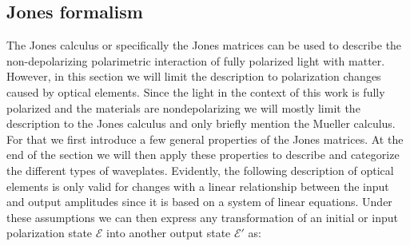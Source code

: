 \subsection{Jones formalism}
\label{sec:jonescalc}
The Jones calculus or specifically the Jones matrices can be used to describe the non-depolarizing polarimetric interaction of fully polarized light with matter. However, in this section we will limit the description to polarization changes caused by optical elements. Since the light in the context of this work is fully polarized and the materials are nondepolarizing we will mostly limit the description to the Jones calculus and only briefly mention the Mueller calculus. For that we first introduce a few general properties of the Jones matrices. At the end of the section we will then apply these properties to describe and categorize the different types of waveplates. Evidently, the following description of optical elements is only valid for changes with a linear relationship between the input and output amplitudes since it is based on a system of linear equations. Under these assumptions we can then express any transformation of an initial or input polarization state $\bm{\mathcal{E}}$ into another output state $\bm{\mathcal{E}}'$ as:

